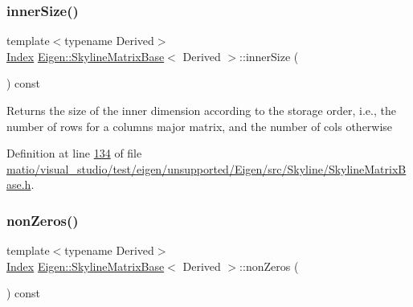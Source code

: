 \mbox{\label{class_eigen_1_1_skyline_matrix_base_a901f2691facc1a0321740300dc7a12d7}} 
\subsubsection{\texorpdfstring{inner\+Size()}{innerSize()}\hspace{0.1cm}{\footnotesize\ttfamily [2/2]}}
{\footnotesize\ttfamily template$<$typename Derived$>$ \\
\hyperlink{group___core___module_a554f30542cc2316add4b1ea0a492ff02}{Index} \hyperlink{class_eigen_1_1_skyline_matrix_base}{Eigen\+::\+Skyline\+Matrix\+Base}$<$ Derived $>$\+::inner\+Size (\begin{DoxyParamCaption}{ }\end{DoxyParamCaption}) const\hspace{0.3cm}{\ttfamily [inline]}}

\begin{DoxyReturn}{Returns}
the size of the inner dimension according to the storage order, i.\+e., the number of rows for a columns major matrix, and the number of cols otherwise 
\end{DoxyReturn}


Definition at line \hyperlink{matio_2visual__studio_2test_2eigen_2unsupported_2_eigen_2src_2_skyline_2_skyline_matrix_base_8h_source_l00134}{134} of file \hyperlink{matio_2visual__studio_2test_2eigen_2unsupported_2_eigen_2src_2_skyline_2_skyline_matrix_base_8h_source}{matio/visual\+\_\+studio/test/eigen/unsupported/\+Eigen/src/\+Skyline/\+Skyline\+Matrix\+Base.\+h}.

\mbox{\label{class_eigen_1_1_skyline_matrix_base_aaeda265186dd626052df8580779b7460}} 
\subsubsection{\texorpdfstring{non\+Zeros()}{nonZeros()}\hspace{0.1cm}{\footnotesize\ttfamily [1/2]}}
{\footnotesize\ttfamily template$<$typename Derived$>$ \\
\hyperlink{group___core___module_a554f30542cc2316add4b1ea0a492ff02}{Index} \hyperlink{class_eigen_1_1_skyline_matrix_base}{Eigen\+::\+Skyline\+Matrix\+Base}$<$ Derived $>$\+::non\+Zeros (\begin{DoxyParamCaption}{ }\end{DoxyParamCaption}) const\hspace{0.3cm}{\ttfamily [inline]}}

